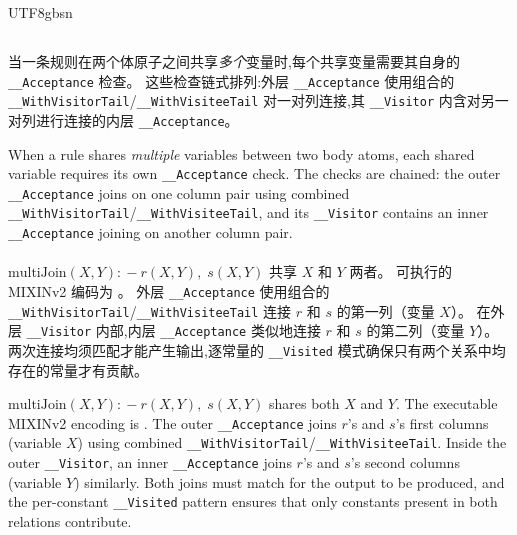 \begin{CJK*}{UTF8}{gbsn}
\subsection{}

\ifPaperChinese
\begin{sloppypar}
当一条规则在两个体原子之间共享\emph{多个}变量时,每个共享变量需要其自身的 \texttt{__Acceptance} 检查。
这些检查链式排列:外层 \texttt{__Acceptance} 使用组合的 \texttt{__WithVisitorTail}/\texttt{__WithVisiteeTail} 对一对列连接,其 \texttt{__Visitor} 内含对另一对列进行连接的内层 \texttt{__Acceptance}。
\end{sloppypar}
\else
When a rule shares \emph{multiple} variables between two
body atoms, each shared variable requires its own
\texttt{__Acceptance} check.
The checks are chained: the outer \texttt{__Acceptance}
joins on one column pair using combined
\texttt{__WithVisitorTail}/\texttt{__WithVisiteeTail}, and
its \texttt{__Visitor} contains an inner \texttt{__Acceptance}
joining on another column pair.
\fi

\paragraph{}
\ifPaperChinese
$\mathrm{multiJoin}(X, Y) \mathrel{{:}\!{-}} r(X, Y),\; s(X, Y)$
共享 $X$ 和 $Y$ 两者。
可执行的 MIXINv2 编码为
。
外层 \texttt{__Acceptance} 使用组合的 \texttt{__WithVisitorTail}/\texttt{__WithVisiteeTail} 连接 $r$ 和 $s$ 的第一列（变量 $X$）。
在外层 \texttt{__Visitor} 内部,内层 \texttt{__Acceptance} 类似地连接 $r$ 和 $s$ 的第二列（变量 $Y$）。
两次连接均须匹配才能产生输出,逐常量的 \texttt{__Visited} 模式确保只有两个关系中均存在的常量才有贡献。
\else
\begin{sloppypar}
$\mathrm{multiJoin}(X, Y) \mathrel{{:}\!{-}} r(X, Y),\; s(X, Y)$
shares both $X$ and $Y$.
The executable MIXINv2 encoding is
.
The outer \texttt{__Acceptance} joins $r$'s and $s$'s first
columns (variable $X$) using combined
\texttt{__WithVisitorTail}/\texttt{__WithVisiteeTail}.
Inside the outer \texttt{__Visitor}, an inner
\texttt{__Acceptance} joins $r$'s and $s$'s second columns
(variable $Y$) similarly.
Both joins must match for the output to be produced, and
the per-constant \texttt{__Visited} pattern ensures that
only constants present in both relations contribute.
\end{sloppypar}
\fi


\end{CJK*}
